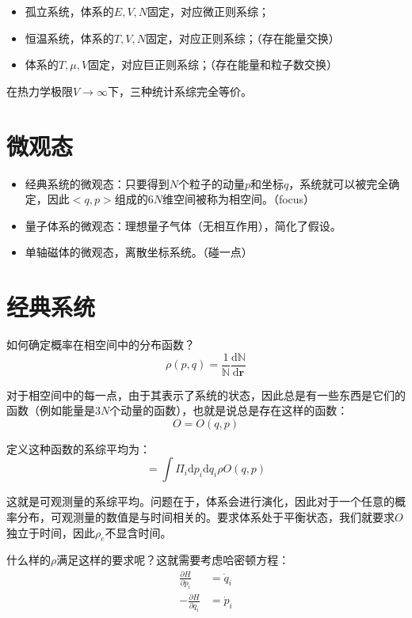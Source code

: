 \documentclass[a4paper, 10pt, openany]{book}%
\begin{document}
\begin{itemize}
  \item 孤立系统，体系的$E,V,N$固定，对应微正则系综；
  \item 恒温系统，体系的$T,V,N$固定，对应正则系综；（存在能量交换）
  \item 体系的$T,\mu,V$固定，对应巨正则系综；（存在能量和粒子数交换）
\end{itemize}

在热力学极限$V\to \infty$下，三种统计系综完全等价。

\section{微观态}
\begin{itemize}
\item 经典系统的微观态：只要得到$N$个粒子的动量$p$和坐标$q$，系统就可以被完全确定，因此$<q,p>$组成的$6N$维空间被称为相空间。（focus）
\item 量子体系的微观态：理想量子气体（无相互作用），简化了假设。
\item 单轴磁体的微观态，离散坐标系统。（碰一点）
\end{itemize}

\section{经典系统}
如何确定概率在相空间中的分布函数？
\begin{equation}
  \rho(p,q)=\frac{1}{\mathds{N}}\frac{\mathrm{d}\mathds{N}}{\mathrm{d}\textbf{r}}
\end{equation}

对于相空间中的每一点，由于其表示了系统的状态，因此总是有一些东西是它们的函数（例如能量是$3N$个动量的函数），也就是说总是存在这样的函数：
\begin{equation}
  O=O(q,p)\end{equation}

定义这种函数的系综平均为：
\begin{equation}
  [O]=\int\Pi_{i}\mathrm{d}p_i\mathrm{d}q_i\rho O(q,p)
\end{equation}

这就是可观测量的系综平均。问题在于，体系会进行演化，因此对于一个任意的概率分布，可观测量的数值是与时间相关的。要求体系处于平衡状态，我们就要求$O$独立于时间，因此$\rho_e$不显含时间。

什么样的$\rho$满足这样的要求呢？这就需要考虑哈密顿方程：
\begin{align}
  \frac{\partial H}{\partial p_i}&=\dot{q}_i\\
  -\frac{\partial H}{\partial q_i}&=\dot{p}_i
\end{align}
\end{document}
